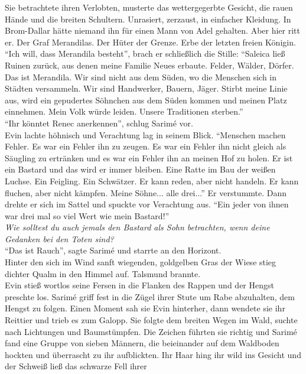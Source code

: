 Sie betrachtete ihren Verlobten, musterte das wettergegerbte Gesicht, die rauen Hände und die 
breiten Schultern. Unrasiert, zerzaust, in einfacher Kleidung. In Brom-Dallar hätte niemand ihn für 
einen Mann von Adel gehalten. Aber hier ritt er. Der Graf Merandilas. Der Hüter der Grenze. Erbe 
der letzten freien Königin.\\
``Ich will, dass Merandila besteht'', brach er schließlich die Stille: ``Saleica ließ Ruinen 
zurück, aus denen meine Familie Neues erbaute. Felder, Wälder, Dörfer. Das ist Merandila. Wir sind 
nicht aus dem Süden, wo die Menschen sich in Städten versammeln. Wir sind Handwerker, Bauern, 
Jäger. Stirbt meine Linie aus, wird ein gepudertes Söhnchen aus dem Süden kommen und meinen Platz 
einnehmen. Mein Volk würde leiden. Unsere Traditionen sterben.''\\
``Ihr könntet Renec anerkennen'', schlug Sarimé vor.\\
Evin lachte höhnisch und Verachtung lag in seinem Blick. ``Menschen machen Fehler. Es war ein 
Fehler ihn zu zeugen. Es war ein Fehler ihn nicht gleich als Säugling zu ertränken und es war ein 
Fehler ihn an meinen Hof zu holen. Er ist ein Bastard und das wird er immer bleiben. Eine Ratte im 
Bau der weißen Luchse. Ein Feigling. Ein Schwätzer. Er kann reden, aber nicht handeln. Er kann 
fluchen, aber nicht kämpfen. Meine Söhne... alle drei...'' Er verstummte. Dann drehte er sich im 
Sattel und spuckte vor Verachtung aus. ``Ein jeder von ihnen war drei mal so viel Wert wie mein 
Bastard!''\\
\textit{Wie solltest du auch jemals den Bastard als Sohn betrachten, wenn deine Gedanken bei den 
Toten sind?}\\
``Das ist Rauch'', sagte Sarimé und starrte an den Horizont.\\
Hinter den sich im Wind sanft wiegenden, goldgelben Gras der Wiese stieg dichter Qualm in den 
Himmel auf. Talsmund brannte.\\
Evin stieß wortlos seine Fersen in die Flanken des Rappen und der Hengst preschte los. Sarimé 
griff fest in die Zügel ihrer Stute um Rabe abzuhalten, dem Hengst zu folgen. Einen Moment sah sie 
Evin hinterher, dann wendete sie ihr Reittier und trieb es zum Galopp. Sie folgte dem breiten Wegen 
im Wald, suchte nach Lichtungen und Baumstümpfen. Die Zeichen führten sie richtig und Sarimé fand 
eine Gruppe von sieben Männern, die beieinander auf dem Waldboden hockten und überrascht zu ihr 
aufblickten. Ihr Haar hing ihr wild ins Gesicht und der Schweiß ließ das schwarze Fell ihrer 
